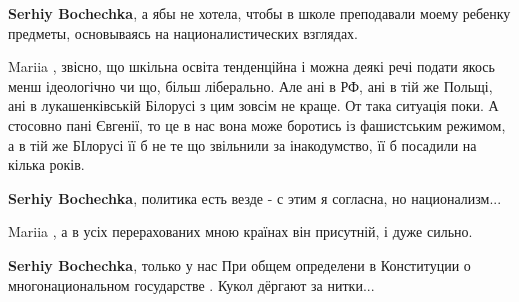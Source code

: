 \begin{itemize}
\begin{itemize}
 
\textbf{Serhiy Bochechka}, а ябы не хотела, чтобы в школе преподавали моему ребенку предметы, основываясь на националистических взглядах.

 
Mariia , звісно, що шкільна освіта тенденційна і можна деякі речі подати якось менш ідеологічно чи що, більш ліберально. Але ані в РФ, ані в тій же Польщі, ані в лукашенківській Білорусі з цим зовсім не краще. От така ситуація поки.
А стосовно пані Євгенії, то це в нас вона може боротись із фашистським режимом, а в тій же БІлорусі її б не те що звільнили за інакодумство, її б посадили на кілька років.

 
\textbf{Serhiy Bochechka}, политика есть везде - с этим я согласна, но национализм...

 
Mariia , а в усіх перерахованих мною країнах він присутній, і дуже сильно.

 
\textbf{Serhiy Bochechka}, только у нас
При общем определени в Конституции о многонациональном государстве .
Кукол дёргают за нитки...

 

\end{itemize}
\end{itemize}
